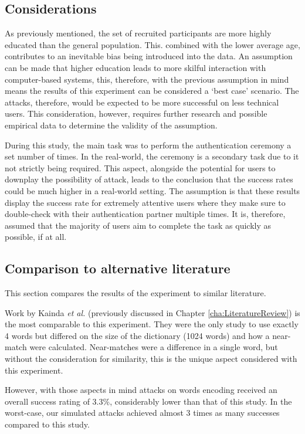\subsection*{Considerations}
As previously mentioned, the set of recruited participants are more highly educated than the general population. This. combined with the lower average age, contributes to an inevitable bias being introduced into the data. An assumption can be made that higher education leads to more skilful interaction with computer-based systems, this, therefore, with the previous assumption in mind means the results of this experiment can be considered a `best case' scenario. The attacks, therefore, would be expected to be more successful on less technical users. This consideration, however, requires further research and possible empirical data to determine the validity of the assumption. 

During this study, the main task was to perform the authentication ceremony a set number of times. In the real-world, the ceremony is a secondary task due to it not strictly being required. This aspect, alongside the potential for users to downplay the possibility of attack, leads to the conclusion that the success rates could be much higher in a real-world setting. The assumption is that these results display the success rate for extremely attentive users where they make sure to double-check with their authentication partner multiple times. It is, therefore, assumed that the majority of users aim to complete the task as quickly as possible, if at all.

\subsection*{Comparison to alternative literature}
This section compares the results of the experiment to similar literature.

Work by Kainda \textit{et al.}\cite{kainda2009usability} (previously discussed in Chapter \ref{cha:LiteratureReview}) is the most comparable to this experiment. They were the only study to use exactly 4 words but differed on the size of the dictionary (1024 words) and how a near-match were calculated. Near-matches were a difference in a single word, but without the consideration for similarity, this is the unique aspect considered with this experiment.

However, with those aspects in mind attacks on words encoding received an overall success rating of 3.3\%, considerably lower than that of this study. In the worst-case, our simulated attacks achieved almost 3 times as many successes compared to this study.

